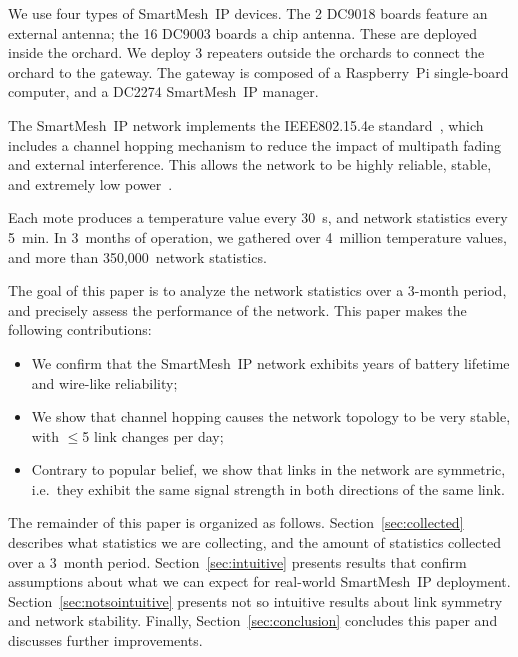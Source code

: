 \documentclass{sig-alternate}
\newcommand{\smip}                {SmartMesh~IP\xspace}
\begin{document}
We use four types of \smip devices.
The 2 DC9018 boards feature an external antenna; the 16 DC9003 boards a chip antenna.
These are deployed inside the orchard.
We deploy 3 repeaters outside the orchards to connect the orchard to the gateway.
The gateway is composed of a Raspberry~Pi single-board computer, and a DC2274 \smip manager.


The \smip network implements the IEEE802.15.4e standard~\cite{std_ieee802154e_2012}, which includes a channel hopping mechanism to reduce the impact of multipath fading and external interference.
This allows the network to be highly reliable, stable, and extremely low power~\cite{watteyne10mitigating, watteyne09reliability}.


Each mote produces a temperature value every 30~s, and network statistics every 5~min.
In 3~months of operation, we gathered over 4~million temperature values, and more than 350,000~network statistics.


The goal of this paper is to analyze the network statistics over a 3-month period, and precisely assess the performance of the network.
\newpage
This paper makes the following contributions:
\begin{itemize}
    \item We confirm that the \smip network exhibits years of battery lifetime and wire-like reliability;
    \item We show that channel hopping causes the network topology to be very stable, with $\leq$5 link changes per day;
    \item Contrary to popular belief, we show that links in the network are symmetric, i.e.~they exhibit the same signal strength in both directions of the same link.
\end{itemize}


The remainder of this paper is organized as follows.
Section~\ref{sec:collected} describes what statistics we are collecting, and the amount of statistics collected over a 3~month period.
Section~\ref{sec:intuitive} presents results that confirm assumptions about what we can expect for real-world \smip deployment.
Section~\ref{sec:notsointuitive} presents not so intuitive results about link symmetry and network stability.
Finally, Section~\ref{sec:conclusion} concludes this paper and discusses further improvements.
\end{document}
